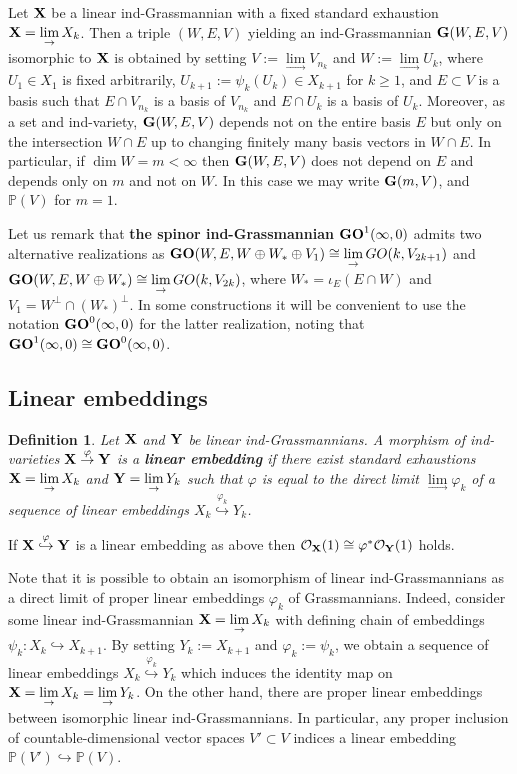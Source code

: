 \documentclass[12pt]{amsart}
\def\PP {{\mathbb P}}     %
\def\hw  {\hookrightarrow}
\def\mc {\mathcal}
\newtheorem{definition}{Definition}[section]
\begin{document}
Let ${\bf X}$ be a linear ind-Grassmannian with a fixed standard exhaustion ${\bf X}=\lim\limits_\to X_k$. Then a triple $(W,E,V)$ yielding an ind-Grassmannian ${\bf G}(W,E,V)$ isomorphic to ${\bf X}$ is obtained by setting $V:=\lim\limits_\to V_{n_k}$ and $W:=\lim\limits_\to U_k$, where $U_1\in X_1$ is fixed arbitrarily, $U_{k+1}:=\psi_k(U_k)\in X_{k+1}$ for $k\geq 1$, and $E\subset V$ is a basis such that $E\cap V_{n_k}$ is a basis of $V_{n_k}$ and $E\cap U_k$ is a basis of $U_k$. Moreover, as a set and ind-variety, ${\bf G}(W,E,V)$ depends not on the entire basis $E$ but only on the intersection $W\cap E$ up to changing finitely many basis vectors in $W\cap E$. In particular, if $\dim W=m<\infty$ then ${\bf G}(W,E,V)$ does not depend on $E$ and depends only on $m$ and not on $W$. In this case we may write ${\bf G}(m,V)$, and $\PP(V)$ for $m=1$.

Let us remark that {\bf the spinor ind-Grassmannian} ${\bf GO}^1(\infty,0)$ admits two alternative realizations as ${\bf GO}(W,E,W\oplus W_*\oplus V_1)\cong \lim\limits_\to GO(k,V_{2k+1})$ and ${\bf GO}(W,E,W\oplus W_*)\cong \lim\limits_\to GO(k,V_{2k})$, where $W_*=\iota_E(E\cap W)$ and $V_1=W^\perp\cap (W_*)^\perp$. In some constructions it will be convenient to use the notation ${\bf GO}^0(\infty,0)$ for the latter realization, noting that ${\bf GO}^1(\infty,0)\cong{\bf GO}^0(\infty,0)$.


\subsection{Linear embeddings}

\begin{definition}\label{Def Lin Embed ind Grass}
Let ${\bf X}$ and ${\bf Y}$ be linear ind-Grassmannians. A morphism of ind-varieties ${\bf X}\stackrel{\varphi}{\to}{\bf Y}$ is a {\bf linear embedding} if there exist standard exhaustions ${\bf X}=\lim\limits_{\to} X_k$ and ${\bf Y}=\lim\limits_{\to} Y_k$ such that $\varphi$ is equal to the direct limit $\lim\limits_{\to} \varphi_k$ of a sequence of linear embeddings $X_k\stackrel{\varphi_k}{\hookrightarrow} Y_k$.
\end{definition}

If ${\bf X}\stackrel{\varphi}{\hw}{\bf Y}$ is a linear embedding as above then $\mc O_{\bf X}(1)\cong \varphi^*\mc O_{\bf Y}(1)$ holds.

Note that it is possible to obtain an isomorphism of linear ind-Grassmannians as a direct limit of proper linear embeddings $\varphi_k$ of Grassmannians. Indeed, consider some linear ind-Grassmannian ${\bf X}=\lim\limits_\to X_k$ with defining chain of embeddings $\psi_k:X_k\hw X_{k+1}$. By setting $Y_k:=X_{k+1}$ and $\varphi_k:=\psi_k$, we obtain a sequence of linear embeddings $X_k\stackrel{\varphi_k}{\hw} Y_k$ which induces the identity map on ${\bf X}=\lim\limits_{\to} X_k = \lim\limits_\to Y_k$. On the other hand, there are proper linear embeddings between isomorphic linear ind-Grassmannians. In particular, any proper inclusion of countable-dimensional vector spaces $V'\subset V$ indices a linear embedding $\PP(V')\hookrightarrow \PP(V)$.
\end{document}
